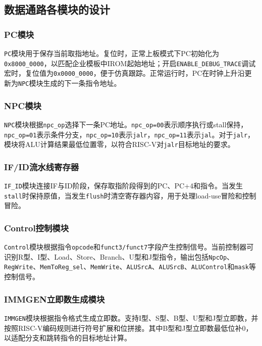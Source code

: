 \documentclass[UTF8,a4paper,12pt]{ctexart}
\newcommand{\code}[1]{\texttt{#1}}
\begin{document}
\subsection{数据通路各模块的设计}

\subsubsection{PC模块}

\code{PC}模块用于保存当前取指地址。复位时，正常上板模式下PC初始化为\code{0x8000\_0000}，以匹配企业模板中IROM起始地址；开启\code{ENABLE\_DEBUG\_TRACE}调试宏时，复位值为\code{0x0000\_0000}，便于仿真跟踪。正常运行时，PC在时钟上升沿更新为\code{NPC}模块生成的下一条指令地址。

\subsubsection{NPC模块}

\code{NPC}模块根据\code{npc\_op}选择下一条PC地址。\code{npc\_op=00}表示顺序执行或stall保持，\code{npc\_op=01}表示条件分支，\code{npc\_op=10}表示\code{jalr}，\code{npc\_op=11}表示\code{jal}。对于\code{jalr}，模块将ALU计算结果最低位置零，以符合RISC-V对\code{jalr}目标地址的要求。

\subsubsection{IF/ID流水线寄存器}

\code{IF\_ID}模块连接IF与ID阶段，保存取指阶段得到的PC、PC+4和指令。当发生\code{stall}时保持原值，当发生\code{flush}时清空寄存器内容，用于处理load-use冒险和控制冒险。

\subsubsection{Control控制模块}

\code{Control}模块根据指令\code{opcode}和\code{funct3/funct7}字段产生控制信号。当前控制器可识别R型、I型、Load、Store、Branch、U型和J型指令，输出包括\code{NpcOp}、\code{RegWrite}、\code{MemToReg\_sel}、\code{MemWrite}、\code{ALUSrcA}、\code{ALUSrcB}、\code{ALUControl}和\code{mask}等控制信号。

\subsubsection{IMMGEN立即数生成模块}

\code{IMMGEN}模块根据指令格式生成立即数。支持I型、S型、B型、U型和J型立即数，并按照RISC-V编码规则进行符号扩展和位拼接。其中B型和J型立即数最低位补0，以适配分支和跳转指令的目标地址计算。
\end{document}
